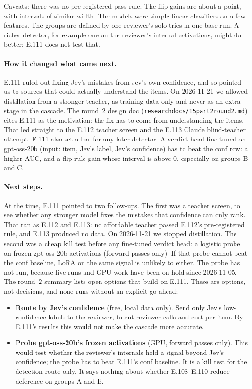 \documentclass[11pt]{article}
\renewcommand{\_}{\origunderscore\allowbreak}
\begin{document}
Caveats: there was no pre-registered pass rule. The flip gains are about a point, with intervals of similar width. The models were simple linear classifiers on a few features. The groups are defined by one reviewer's solo tries in one base run. A richer detector, for example one on the reviewer's internal activations, might do better; E.111 does not test that.

\paragraph{How it changed what came next.}
E.111 ruled out fixing Jev's mistakes from Jev's own confidence, and so pointed us to sources that could actually understand the items. On 2026-11-21 we allowed distillation from a stronger teacher, as training data only and never as an extra stage in the cascade. The round~2 design doc (\texttt{research\_docs/15\_part2\_round2.md}) cites E.111 as the motivation: the fix has to come from understanding the items. That led straight to the E.112 teacher screen and the E.113 Claude blind-teacher attempt. E.111 also set a bar for any later detector. A verdict head fine-tuned on gpt-oss-20b (input: item, Jev's label, Jev's confidence) has to beat the conf row: a higher AUC, and a flip-rule gain whose interval is above 0, especially on groups B and C.

\paragraph{Next steps.}
At the time, E.111 pointed to two follow-ups. The first was a teacher screen, to see whether any stronger model fixes the mistakes that confidence can only rank. That ran as E.112 and E.113: no affordable teacher passed E.112's pre-registered rule, and E.113 produced no data. On 2026-11-21 we stopped distillation. The second was a cheap kill test before any fine-tuned verdict head: a logistic probe on frozen gpt-oss-20b activations (forward passes only). If that probe cannot beat the conf baseline, LoRA on the same signal is unlikely to either. The probe has not run, because live runs and GPU work have been on hold since 2026-11-05. The round~2 summary lists open options that build on E.111. These are options, not decisions, and none runs without an explicit go-ahead:
\begin{itemize}[nosep]
  \item \textbf{Route by Jev's confidence} (free, local data only). Send only Jev's low-confidence labels to the reviewer, to cut reviewer calls and cost per item. By E.111's results this would not make the cascade more accurate.
  \item \textbf{Probe gpt-oss-20b's frozen activations} (GPU, forward passes only). This would test whether the reviewer's internals hold a signal beyond Jev's confidence; the probe has to beat E.111's conf baseline. It is a kill test for the detection route only. It says nothing about whether E.108--E.110 reduce deference on groups A and B.
\end{itemize}
\end{document}
